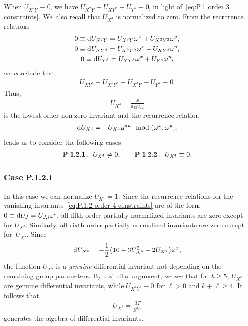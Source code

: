 \documentclass[pdftex]{sigma}%
\numberwithin{equation}{section}
\begin{document}
When $U_{X^2Y}\equiv 0$, we have $U_{X^2Y}\equiv U_{XY^2}\equiv U_{Y^3}\equiv0$, in light of~\eqref{eq:P.1 order 3 constraints}. We~also recall that $U_{X^3}$ is normalized to zero. From the recurrence relations
%
\begin{gather*}
0 \equiv {\rm d}U_{X^2Y} = U_{X^3Y}\omega^x + U_{X^2Y^2}\omega^y, \\
0 \equiv {\rm d}U_{XY^2} = U_{X^2Y^2}\omega^x + U_{XY^3}\omega^y, \\
0 \equiv {\rm d}U_{Y^3} = U_{XY^3}\omega^x + U_{Y^4}\omega^y,
\end{gather*}
%
we conclude that
%
\begin{gather}\label{eq:P.1.2 order 4 constraints}
U_{XY^3} \equiv U_{X^2Y^2}\equiv U_{X^3Y}\equiv U_{Y^4} \equiv 0.
\end{gather}
%
Thus,
\begin{gather*}
U_{X^4} = \frac{S}{a_{33}u_{xx}}
\end{gather*}
is the lowest order non-zero invariant and the recurrence relation
\begin{gather*}
{\rm d}U_{X^4}= - U_{X^4}\mu^{uu} \mod (\omega^x,\omega^y),
\end{gather*}
leads us to consider the following cases
\begin{gather*}
{\bf P.1.2.1}\colon\ U_{X^4}\neq 0,\qquad
{\bf P.1.2.2}\colon\ U_{X^4}\equiv 0.
\end{gather*}

\subsubsection{Case P.1.2.1}

In this case we can normalize $U_{X^4}=1$. Since the recurrence relations for the vanishing invariants~\eqref{eq:P.1.2 order 4 constraints} are of the form $0\equiv {\rm d}U_J = U_{J,i}\omega^i$, all fifth order partially normalized invariants are zero except for $U_{X^5}$. Similarly, all sixth order partially normalized invariants are zero except for~$U_{X^6}$. Since
\begin{gather*}
{\rm d}U_{X^5}=-\frac{1}{2}\big(10+3U_{X^5}^2-2U_{X^6}\big) \omega^x,
\end{gather*}
the function $U_{X^5}$ is a \emph{genuine} differential invariant not depending on the remaining group parameters. By a similar argument, we see that for $k\geq 5$, $U_{X^k}$ are genuine differential invariants, while $U_{X^kY^\ell}\equiv 0$ for $\ell>0$ and $k+\ell \geq4$. It follows that
\begin{gather*}
U_{X^5}=\frac{3T}{S^{3/2}}
\end{gather*}
generates the algebra of differential invariants.
\end{document}
